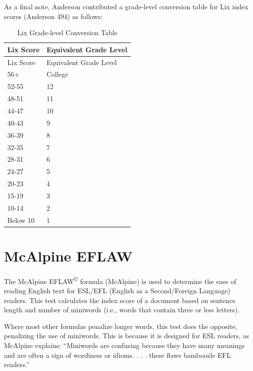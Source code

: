 \documentclass[
]{book}
\theoremstyle{definition}
\theoremstyle{definition}
\theoremstyle{definition}
\theoremstyle{definition}
\theoremstyle{remark}
\begin{document}
\begin{minipage}{\textwidth}

As a final note, Anderson contributed a grade-level conversion table for Lix index scores (Anderson 494) as follows:

\begin{longtable}[]{@{}ll@{}}
\caption{Lix Grade-level Conversion Table}\tabularnewline
\toprule
Lix Score & Equivalent Grade Level \\
\midrule
\endfirsthead
\toprule
Lix Score & Equivalent Grade Level \\
\midrule
\endhead
56+ & College \\
52-55 & 12 \\
48-51 & 11 \\
44-47 & 10 \\
40-43 & 9 \\
36-39 & 8 \\
32-35 & 7 \\
28-31 & 6 \\
24-27 & 5 \\
20-23 & 4 \\
15-19 & 3 \\
10-14 & 2 \\
Below 10 & 1 \\
\bottomrule
\end{longtable}

\end{minipage}

\newpage

\hypertarget{eflaw-test}{%
\section{\texorpdfstring{McAlpine EFLAW}{McAlpine EFLAW}}\label{eflaw-test}}

The McAlpine EFLAW\textsuperscript{©} formula (McAlpine) is used to determine the ease of reading English text for ESL/EFL (English as a Second/Foreign Language) readers. This test calculates the index score of a document based on sentence length and number of miniwords (i.e., words that contain three or less letters).

Where most other formulas penalize longer words, this test does the opposite, penalizing the use of miniwords. This is because it is designed for ESL readers, as McAlpine explains: ``Miniwords are confusing because they have many meanings and are often a sign of wordiness or idioms. . . . these flaws bamboozle EFL readers.''
\end{document}
